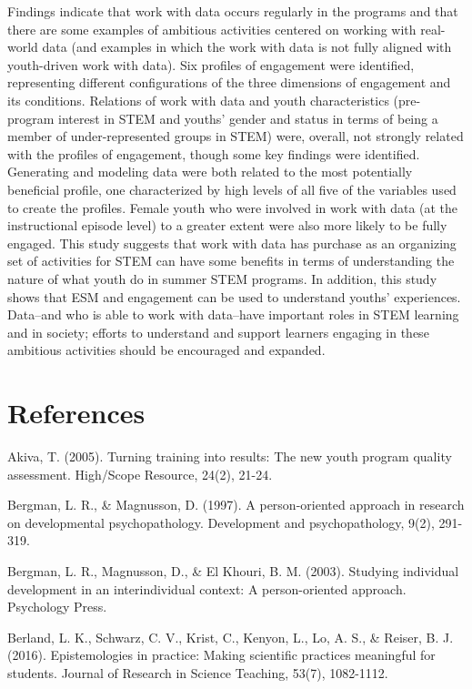 \documentclass[]{book}
\theoremstyle{definition}
\theoremstyle{definition}
\theoremstyle{definition}
\theoremstyle{remark}
\begin{document}
Findings indicate that work with data occurs regularly in the programs
and that there are some examples of ambitious activities centered on
working with real-world data (and examples in which the work with data
is not fully aligned with youth-driven work with data). Six profiles of
engagement were identified, representing different configurations of the
three dimensions of engagement and its conditions. Relations of work
with data and youth characteristics (pre-program interest in STEM and
youths' gender and status in terms of being a member of
under-represented groups in STEM) were, overall, not strongly related
with the profiles of engagement, though some key findings were
identified. Generating and modeling data were both related to the most
potentially beneficial profile, one characterized by high levels of all
five of the variables used to create the profiles. Female youth who were
involved in work with data (at the instructional episode level) to a
greater extent were also more likely to be fully engaged. This study
suggests that work with data has purchase as an organizing set of
activities for STEM can have some benefits in terms of understanding the
nature of what youth do in summer STEM programs. In addition, this study
shows that ESM and engagement can be used to understand youths'
experiences. Data--and who is able to work with data--have important
roles in STEM learning and in society; efforts to understand and support
learners engaging in these ambitious activities should be encouraged and
expanded.

\chapter{References}\label{references}

\setlength{\parindent}{-0.2in} \setlength{\leftskip}{0.2in}
\setlength{\parskip}{8pt} \noindent

Akiva, T. (2005). Turning training into results: The new youth program
quality assessment. High/Scope Resource, 24(2), 21-24.

Bergman, L. R., \& Magnusson, D. (1997). A person-oriented approach in
research on developmental psychopathology. Development and
psychopathology, 9(2), 291-319.

Bergman, L. R., Magnusson, D., \& El Khouri, B. M. (2003). Studying
individual development in an interindividual context: A person-oriented
approach. Psychology Press.

Berland, L. K., Schwarz, C. V., Krist, C., Kenyon, L., Lo, A. S., \&
Reiser, B. J. (2016). Epistemologies in practice: Making scientific
practices meaningful for students. Journal of Research in Science
Teaching, 53(7), 1082-1112.
\end{document}
